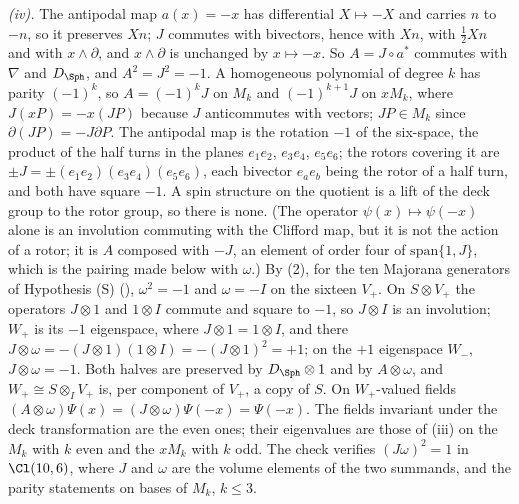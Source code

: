 \emph{(iv).} The antipodal map $a(x) = -x$ has differential $X \mapsto -X$ and carries $n$ to $-n$, so it preserves $Xn$; $J$ commutes with bivectors, hence with $Xn$, with $\tfrac12Xn$ and with $x \wedge \partial$, and $x \wedge \partial$ is unchanged by $x \mapsto -x$. So $A = J \circ a^{*}$ commutes with $\nabla$ and $D_{\Sph}$, and $A^{2} = J^{2} = -1$. A homogeneous polynomial of degree $k$ has parity $(-1)^{k}$, so $A = (-1)^{k}J$ on $M_{k}$ and $(-1)^{k+1}J$ on $xM_{k}$, where $J(xP) = -x(JP)$ because $J$ anticommutes with vectors; $JP \in M_{k}$ since $\partial(JP) = -J\partial P$. The antipodal map is the rotation $-1$ of the six-space, the product of the half turns in the planes $e_{1}e_{2}$, $e_{3}e_{4}$, $e_{5}e_{6}$; the rotors covering it are $\pm J = \pm(e_{1}e_{2})(e_{3}e_{4})(e_{5}e_{6})$, each bivector $e_{a}e_{b}$ being the rotor of a half turn, and both have square $-1$. A spin structure on the quotient is a lift of the deck group to the rotor group, so there is none. (The operator $\psi(x) \mapsto \psi(-x)$ alone is an involution commuting with the Clifford map, but it is not the action of a rotor; it is $A$ composed with $-J$, an element of order four of $\mathrm{span}\{1, J\}$, which is the pairing made below with $\omega$.) By (2), for the ten Majorana generators of Hypothesis (S) (), $\omega^{2} = -1$ and $\omega = -I$ on the sixteen $V_{+}$. On $S \otimes V_{+}$ the operators $J \otimes 1$ and $1 \otimes I$ commute and square to $-1$, so $J \otimes I$ is an involution; $W_{+}$ is its $-1$ eigenspace, where $J \otimes 1 = 1 \otimes I$, and there $J \otimes \omega = -(J \otimes 1)(1 \otimes I) = -(J \otimes 1)^{2} = +1$; on the $+1$ eigenspace $W_{-}$, $J \otimes \omega = -1$. Both halves are preserved by $D_{\Sph} \otimes 1$ and by $A \otimes \omega$, and $W_{+} \cong S \otimes_{I} V_{+}$ is, per component of $V_{+}$, a copy of $S$. On $W_{+}$-valued fields $(A \otimes \omega)\Psi(x) = (J \otimes \omega)\Psi(-x) = \Psi(-x)$. The fields invariant under the deck transformation are the even ones; their eigenvalues are those of (iii) on the $M_{k}$ with $k$ even and the $xM_{k}$ with $k$ odd. The check verifies $(J\omega)^{2} = 1$ in $\Cl(10,6)$, where $J$ and $\omega$ are the volume elements of the two summands, and the parity statements on bases of $M_{k}$, $k \le 3$.

